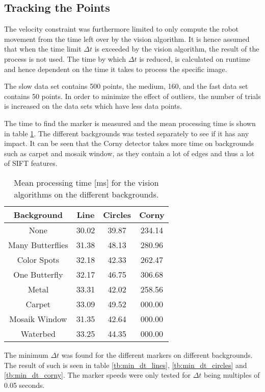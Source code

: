 \subsection{Tracking the Points}
The velocity constraint was furthermore limited to only compute the robot movement from the time left over by the vision algorithm.
It is hence assumed that when the time limit $\Delta t$ is exceeded by the vision algorithm, the result of the process is not used.
The time by which $\Delta t$ is reduced, is calculated on runtime and hence dependent on the time it takes to process the specific image.

The slow data set contains 500 points, the medium, 160, and the fast data set contains 50 points.
In order to minimize the effect of outliers, the number of trials is increased on the data sets which have less data points.

The time to find the marker is measured and the mean processing time is shown in table \ref{tb:mean_processing_time}.
The different backgrounds was tested separately to see if it has any impact.
It can be seen that the Corny detector takes more time on backgrounds such as carpet and mosaik window, as they contain a lot of edges and thus a lot of SIFT features.

\begin{table}[H]
\center
\begin{tabular}{|c|c|c|c|}
\hline
Background       & Line      & Circles   & Corny     \\ \hline
None             & 30.02 & 39.87 & 234.14 \\ \hline
Many Butterflies & 31.38 & 48.13 & 280.96 \\ \hline
Color Spots      & 32.18 & 42.33 & 262.47 \\ \hline
One Butterfly    & 32.17 & 46.75 & 306.68 \\ \hline
Metal            & 33.31 & 42.02 & 258.56 \\ \hline
Carpet           & 33.09 & 49.52 & 000.00 \\ \hline
Mosaik Window    & 31.35 & 42.64 & 000.00 \\ \hline
Waterbed         & 33.25 & 44.35 & 000.00 \\ \hline
\end{tabular}
\caption{Mean processing time [ms] for the vision algorithms on the different backgrounds.}
\label{tb:mean_processing_time}
\end{table}

The minimum $\Delta t$ was found for the different markers on different backgrounds.
The result of such is seen in table \ref{tb:min_dt_lines}, \ref{tb:min_dt_circles}
 and \ref{tb:min_dt_corny}.
The marker speeds were only tested for $\Delta t$ being multiples of 0.05 seconds.


